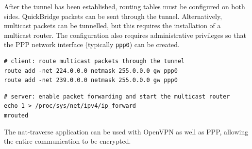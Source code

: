 After the tunnel has been established, routing tables must be configured on both sides.
QuickBridge packets can be sent through the tunnel. Alternatively, multicast packets can be tunnelled, but this requires the installation of a multicast router.
The configuration also requires administrative privileges so that the PPP network interface (typically \verb|ppp0|) can be created.

\begin{verbatim}
# client: route multicast packets through the tunnel
route add -net 224.0.0.0 netmask 255.0.0.0 gw ppp0
route add -net 239.0.0.0 netmask 255.0.0.0 gw ppp0
\end{verbatim}

\begin{verbatim}
# server: enable packet forwarding and start the multicast router
echo 1 > /proc/sys/net/ipv4/ip_forward
mrouted
\end{verbatim}

The nat-traverse application can be used with OpenVPN as well as PPP, allowing the entire communication to be encrypted.
\proofed
